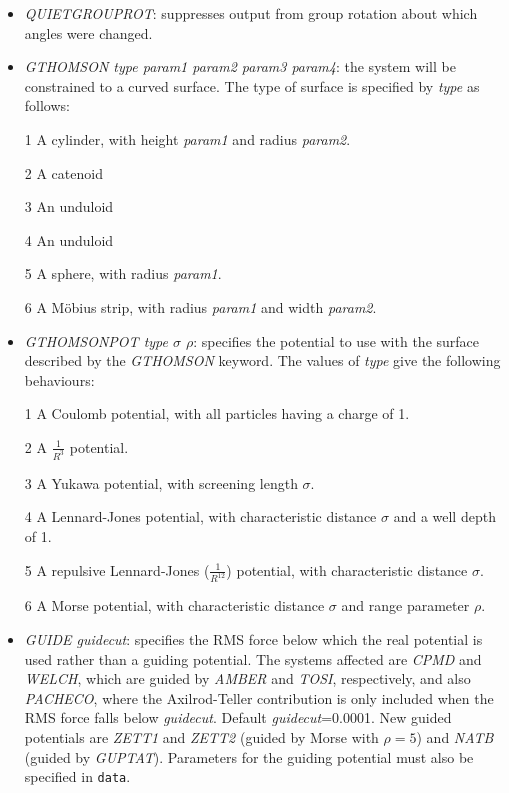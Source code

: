 \documentclass[12pt,a4paper,dvips]{article}
\begin{document}
\begin{itemize}
{\textrm 27}

{\textrm 28}

{\textrm 29}

\item {\it QUIETGROUPROT}: suppresses output from group rotation about which angles were changed.

\item {\it GTHOMSON type param1 param2 param3 param4}: the system will be constrained to a curved surface.
The type of surface is specified by {\it type} as follows:

1 A cylinder, with height {\it param1} and radius {\it param2}.

2 A catenoid

3 An unduloid

4 An unduloid

5 A sphere, with radius {\it param1}.

6 A M\"{o}bius strip, with radius {\it param1} and width {\it param2}.

\item {\it GTHOMSONPOT type $\sigma$ $\rho$}: specifies the potential to use with the surface described by 
the {\it GTHOMSON} keyword. The values of {\it type} give the following behaviours:

1 A Coulomb potential, with all particles having a charge of 1.

2 A $\frac{\displaystyle 1}{\displaystyle R^{3}}$ potential.

3 A Yukawa potential, with screening length {\it $\sigma$}.

4 A Lennard-Jones potential, with characteristic distance {\it $\sigma$} and a well depth of 1.

5 A repulsive Lennard-Jones ($\frac{\displaystyle 1}{\displaystyle R^{12}}$) potential, 
with characteristic distance {\it $\sigma$}.

6 A Morse potential, with characteristic distance {\it $\sigma$} and range parameter {\it $\rho$}.

\item {\it GUIDE\/ guidecut}: specifies the RMS force below which the real potential is used
rather than a guiding potential. The systems affected are {\it CPMD\/} and {\it WELCH},
which are guided by {\it AMBER\/} and {\it TOSI\/}, respectively, and also {\it PACHECO\/},
where the Axilrod-Teller contribution is only included when the RMS force falls below
{\it guidecut\/}. Default {\it guidecut\/}=0.0001.
New guided potentials are {\it ZETT1} and {\it ZETT2} (guided by Morse with $\rho=5$) and
{\it NATB} (guided by {\it GUPTAT}). Parameters for the guiding potential must also be specified in
{\tt data}.


\end{itemize}
\end{document}
